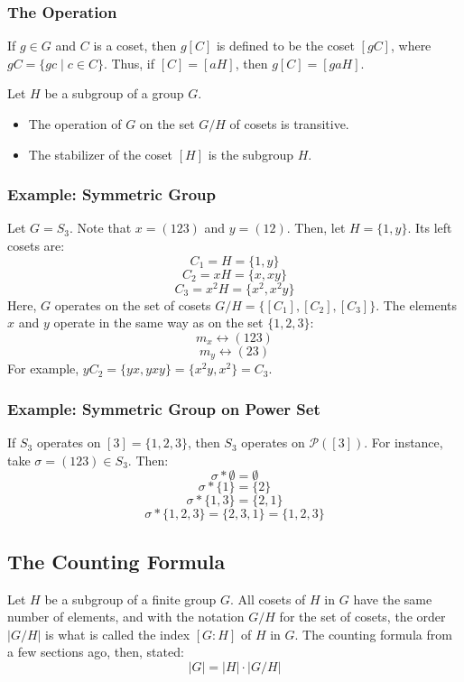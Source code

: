 \documentclass[letterpaper]{article}
\begin{document}
\bigskip 

\subsubsection{The Operation}
If $g \in G$ and $C$ is a coset, then $g[C]$ is defined to be the coset $[gC]$, where $gC = \{gc \mid c \in C\}$. Thus, if $[C] = [aH]$, then $g[C] = [gaH]$. 

\begin{mdframed}
    \begin{proposition}
        Let $H$ be a subgroup of a group $G$. 
        \begin{itemize}
            \item The operation of $G$ on the set $G / H$ of cosets is transitive. 
            \item The stabilizer of the coset $[H]$ is the subgroup $H$. 
        \end{itemize}
    \end{proposition}
\end{mdframed}

\subsubsection{Example: Symmetric Group}
Let $G = S_3$. Note that $x = (123)$ and $y = (12)$. Then, let $H = \{1, y\}$. Its left cosets are: 
\[C_1 = H = \{1, y\}\]
\[C_2 = xH = \{x, xy\}\]
\[C_3 = x^2 H = \{x^2, x^2 y\}\]
Here, $G$ operates on the set of cosets $G / H = \{[C_1], [C_2], [C_3]\}$. The elements $x$ and $y$ operate in the same way as on the set $\{1, 2, 3\}$: 
\[m_x \longleftrightarrow (123)\]
\[m_y \longleftrightarrow (23)\]
For example, $yC_2 = \{yx, yxy\} = \{x^2 y, x^2\} = C_3$. 

\subsubsection{Example: Symmetric Group on Power Set}
If $S_3$ operates on $[3] = \{1, 2, 3\}$, then $S_3$ operates on $\mathcal{P}([3])$. For instance, take $\sigma = (123) \in S_3$. Then: 
\[\sigma * \emptyset = \emptyset\]
\[\sigma * \{1\} = \{2\}\]
\[\sigma * \{1, 3\} = \{2, 1\}\]
\[\sigma * \{1, 2, 3\} = \{2, 3, 1\} = \{1, 2, 3\}\]

\subsection{The Counting Formula}
Let $H$ be a subgroup of a finite group $G$. All cosets of $H$ in $G$ have the same number of elements, and with the notation $G / H$ for the set of cosets, the order $|G / H|$ is what is called the index $[G: H]$ of $H$ in $G$. The counting formula from a few sections ago, then, stated: 
\[|G| = |H| \cdot |G / H|\]
\end{document}
